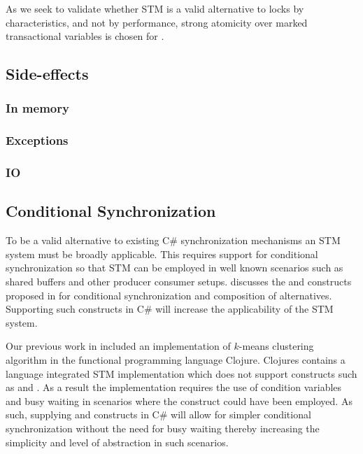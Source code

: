 As we seek to validate whether \ac{STM} is a valid alternative to locks by characteristics, and not by performance, strong atomicity over marked transactional variables is chosen for \stmname.

\subsection{Side-effects}

\subsubsection{In memory}
\subsubsection{Exceptions}

\subsubsection{IO}


 
\subsection{Conditional Synchronization}
\label{sec:req_conditional}
To be a valid alternative to existing C\# synchronization mechanisms an \ac{STM} system must be broadly applicable. This requires support for conditional synchronization so that \ac{STM} can be employed in well known scenarios such as shared buffers and other producer consumer setups\cite[p. 128]{tanenbaum2008modern}.  discusses the  and  constructs proposed in \cite{harris2005composable} for conditional synchronization and composition of alternatives. Supporting such constructs in C\# will increase the applicability of the \ac{STM} system.

Our previous work in \cite{dpt907e14trending} included an implementation of $k$-means clustering algorithm\cite[p. 451]{dataminingconceptsandtechniques} in the functional programming language Clojure. Clojures contains a language integrated \ac{STM} implementation which does not support constructs such as  and . As a result the implementation requires the use of condition variables and busy waiting in scenarios where the  construct could have been employed\cite{duffy2010stmnet}.  As such, supplying  and  constructs in C\# will allow for simpler conditional synchronization without the need for busy waiting thereby increasing the simplicity and level of abstraction in such scenarios.
